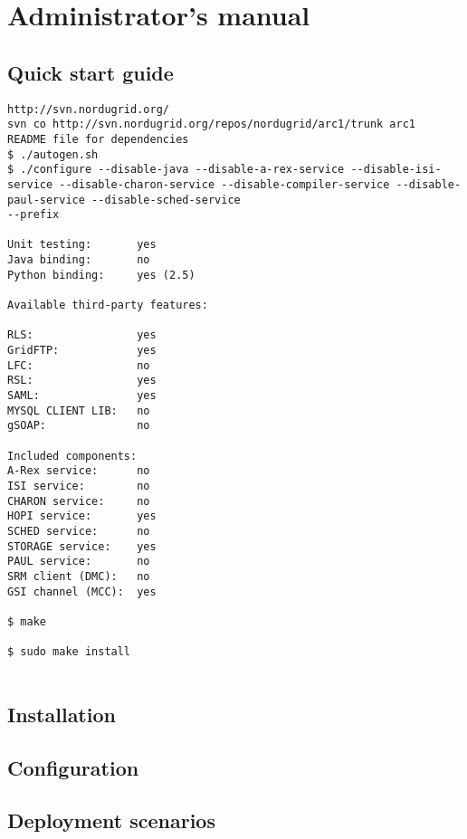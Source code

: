 \documentclass{book}
\begin{document}
\chapter{Administrator's manual} %
\label{cha:administrator_s_manual}

\section{Quick start guide} %
\label{sec:quick_start_guide}

\begin{verbatim}
http://svn.nordugrid.org/
svn co http://svn.nordugrid.org/repos/nordugrid/arc1/trunk arc1   
README file for dependencies
$ ./autogen.sh
$ ./configure --disable-java --disable-a-rex-service --disable-isi-service --disable-charon-service --disable-compiler-service --disable-paul-service --disable-sched-service
--prefix

Unit testing:       yes
Java binding:       no
Python binding:     yes (2.5)

Available third-party features:

RLS:                yes
GridFTP:            yes
LFC:                no
RSL:                yes
SAML:               yes
MYSQL CLIENT LIB:   no
gSOAP:              no

Included components:
A-Rex service:      no
ISI service:        no
CHARON service:     no
HOPI service:       yes
SCHED service:      no
STORAGE service:    yes
PAUL service:       no
SRM client (DMC):   no
GSI channel (MCC):  yes

$ make

$ sudo make install


\end{verbatim}



\section{Installation} %
\label{sec:installation}


\section{Configuration} %
\label{sec:configuration}


\section{Deployment scenarios} %
\label{sec:deployment_scenarios}
\end{document}
